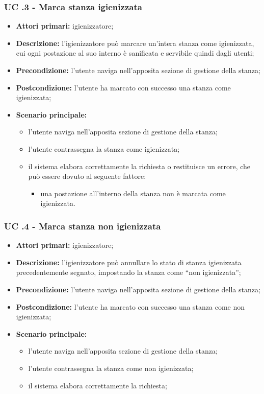\subsubsection{UC .3 - Marca stanza igienizzata}

\begin{itemize}
\item \textbf{Attori primari:} igienizzatore;
\item \textbf{Descrizione:} l’igienizzatore può marcare un'intera stanza come igienizzata, cui ogni postazione al suo interno è sanificata e servibile quindi dagli utenti;
\item \textbf{Precondizione:} l'utente naviga nell’apposita sezione di gestione della stanza; 
\item \textbf{Postcondizione:} l'utente ha marcato con successo una stanza come igienizzata;
\item \textbf{Scenario principale:} 
	\begin{itemize}
		\item l’utente naviga nell’apposita sezione di gestione della stanza;	
		\item l'utente contrassegna la stanza come igienizzata;
		\item il sistema elabora correttamente la richiesta o restituisce un errore, che può essere dovuto al seguente fattore:
			\begin {itemize}
				\item una postazione all’interno della stanza non è marcata come igienizzata.
			\end{itemize}
		\end{itemize}
\end{itemize}

\subsubsection{UC .4 - Marca stanza non igienizzata}

\begin{itemize}
\item \textbf{Attori primari:} igienizzatore;
\item \textbf{Descrizione:} l’igienizzatore può annullare lo stato di stanza igienizzata precedentemente segnato, impostando la stanza come “non igienizzata”;
\item \textbf{Precondizione:} l'utente naviga nell’apposita sezione di gestione della stanza; 
\item \textbf{Postcondizione:} l'utente ha marcato con successo una stanza come non igienizzata;
\item \textbf{Scenario principale:} 
	\begin{itemize}
		\item l’utente naviga nell’apposita sezione di gestione della stanza;	
		\item l'utente contrassegna la stanza come non igienizzata;
		\item il sistema elabora correttamente la richiesta;
	\end{itemize}
\end{itemize}

